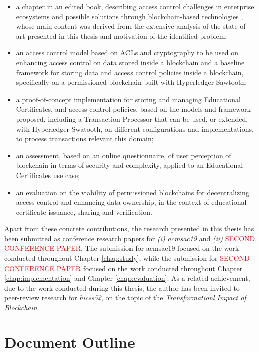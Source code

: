 \begin{itemize}
    \item a chapter in an edited book, describing access control challenges in enterprise ecosystems and possible solutions through blockchain-based technologies \cite{bryan_christiansen_access_2018}, whose main content was derived from the extensive analysis of the state-of-art presented in this thesis and motivation of the identified problem;
    \item an access control model based on ACLs and cryptography to be used on enhancing access control on data stored inside a blockchain and a baseline framework for storing data and access control policies inside a blockchain, specifically on a permissioned blockchain built with Hyperledger Sawtooth;
    \item a proof-of-concept implementation for storing and managing Educational Certificates, and access control policies, based on the models and framework proposed, including a Transaction Processor that can be used, or extended, with Hyperledger Swatooth, on different configurations and implementations, to process transactions relevant this domain;
    \item an assessment, based on an online questionnaire, of user perception of blockchain in terms of security and complexity, applied to an Educational Certificates use case;
    \item an evaluation on the viability of permissioned blockchains for decentralizing access control and enhancing data ownership, in the context of educational certificate issuance, sharing and verification.
\end{itemize}

Apart from these concrete contributions, the research presented in this thesis has been submitted as conference research papers for \emph{(i)} \textit{\gls{acmsac19}} and \emph{(ii)} \textcolor{red}{SECOND CONFERENCE PAPER}. The submission for \gls{acmsac19} focused on the work conducted throughout Chapter \ref{chap:study}, while the submission for \textcolor{red}{SECOND CONFERENCE PAPER} focused on the work conducted throughout Chapter \ref{chap:implementation} and Chapter \ref{chap:evaluation}. As a related achievement, due to the work conducted during this thesis, the author has been invited to peer-review research for \textit{\glsdesc{hicss52}}, on the topic of the \textit{Transformationl Impact of Blockchain}.

\section{Document Outline}

